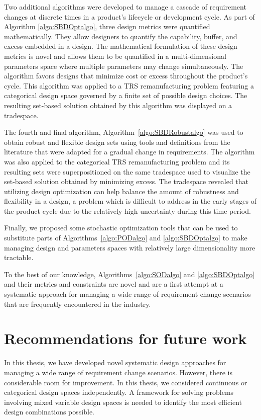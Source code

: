 Two additional algorithms were developed to manage a cascade of requirement chang\-es at discrete times in a product's lifecycle or development cycle. As part of Algorithm \ref{algo:SBDOptalgo}, three design metrics were quantified mathematically. They allow designers to quantify the capability, buffer, and excess embedded in a design. The mathematical formulation of these design metrics is novel and allows them to be quantified in a multi-dimensional parameters space where multiple parameters may change simultaneously. The algorithm favors designs that minimize cost or excess throughout the product's cycle. This algorithm was applied to a \ac{TRS} remanufacturing problem featuring a categorical design space governed by a finite set of possible design choices. The resulting set-based solution obtained by this algorithm was displayed on a tradespace.

The fourth and final algorithm, Algorithm~\ref{algo:SBDRobustalgo} was used to obtain robust and flexible design sets using tools and definitions from the literature that were adapted for a gradual change in requirements. The algorithm was also applied to the categorical \ac{TRS} remanufacturing problem and its resulting sets were superpositioned on the same tradespace used to visualize the set-based solution obtained by minimizing excess. The tradespace revealed that utilizing design optimization can help balance the amount of robustness and flexibility in a design, a problem which is difficult to address in the early stages of the product cycle due to the relatively high uncertainty during this time period.

Finally, we proposed some stochastic optimization tools that can be used to substitute parts of Algorithms~\ref{algo:PODalgo} and \ref{algo:SBDOptalgo} to make managing design and parameters spaces with relatively large dimensionality more tractable.

To the best of our knowledge, Algorithms~\ref{algo:SODalgo} and \ref{algo:SBDOptalgo} and their metrics and constraints are novel and are a first attempt at a systematic approach for managing a wide range of requirement change scenarios that are frequently encountered in the industry.

\section{Recommendations for future work}
\label{sec:futurework}

In this thesis, we have developed novel systematic design approaches for managing a wide range of requirement change scenarios. However, there is considerable room for improvement. In this thesis, we considered continuous or categorical design spaces independently. A framework for solving problems involving mixed variable design spaces is needed to identify the most efficient design combinations possible. 

